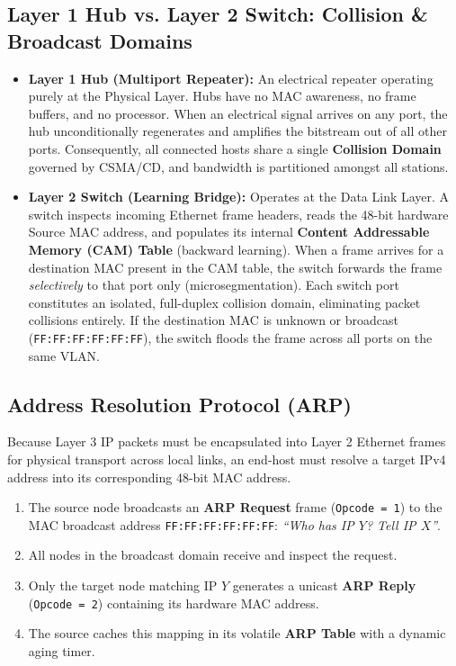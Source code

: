 \documentclass[12pt, a4paper]{article}
\begin{document}
\subsection{Layer 1 Hub vs. Layer 2 Switch: Collision \& Broadcast Domains}
\begin{itemize}
    \item \textbf{Layer 1 Hub (Multiport Repeater):} An electrical repeater operating purely at the Physical Layer. Hubs have no MAC awareness, no frame buffers, and no processor. When an electrical signal arrives on any port, the hub unconditionally regenerates and amplifies the bitstream out of all other ports. Consequently, all connected hosts share a single \textbf{Collision Domain} governed by CSMA/CD, and bandwidth is partitioned amongst all stations.
    \item \textbf{Layer 2 Switch (Learning Bridge):} Operates at the Data Link Layer. A switch inspects incoming Ethernet frame headers, reads the 48-bit hardware Source MAC address, and populates its internal \textbf{Content Addressable Memory (CAM) Table} (backward learning). When a frame arrives for a destination MAC present in the CAM table, the switch forwards the frame \textit{selectively} to that port only (microsegmentation). Each switch port constitutes an isolated, full-duplex collision domain, eliminating packet collisions entirely. If the destination MAC is unknown or broadcast (\texttt{FF:FF:FF:FF:FF:FF}), the switch floods the frame across all ports on the same VLAN.
\end{itemize}

\subsection{Address Resolution Protocol (ARP)}
Because Layer 3 IP packets must be encapsulated into Layer 2 Ethernet frames for physical transport across local links, an end-host must resolve a target IPv4 address into its corresponding 48-bit MAC address. 
\begin{enumerate}
    \item The source node broadcasts an \textbf{ARP Request} frame (\texttt{Opcode = 1}) to the MAC broadcast address \texttt{FF:FF:FF:FF:FF:FF}: \textit{``Who has IP $Y$? Tell IP $X$''}.
    \item All nodes in the broadcast domain receive and inspect the request.
    \item Only the target node matching IP $Y$ generates a unicast \textbf{ARP Reply} (\texttt{Opcode = 2}) containing its hardware MAC address.
    \item The source caches this mapping in its volatile \textbf{ARP Table} with a dynamic aging timer.
\end{enumerate}
\end{document}
